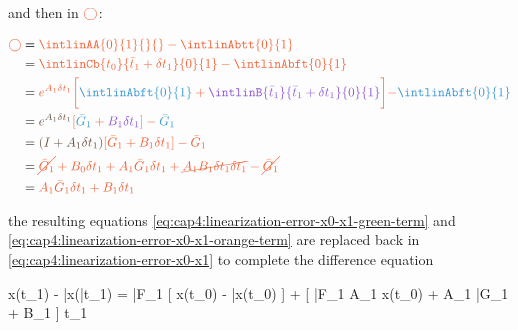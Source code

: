 \noindent
and then in $\orange{\bigcirc}$:

\noindent
\begin{align}
	\label{eq:cap4:linearization-error-x0-x1-orange-term}
	\orange{\bigcirc} 	&= \orange{ \intlinAA{0}{1}{}{} - \intlinAbtt{0}{1} } \nonumber \\ 
				   	&= \orange{ \intlinCb{t_0}{\bar{t}_1+\delta t_1}{0}{1} - \intlinAbft{0}{1} } \nonumber \\
				   	&= \orange{ e^{A_1 \delta t_1} \bigg[ \blue{\intlinAbft{0}{1}} + \purple{\intlinB{\bar{t}_1}{\bar{t}_1 + \delta t_1}{0}{1}} \bigg] }
				   	   \orange{ -\blue{\intlinAbft{0}{1}} } \nonumber \\
				   	&= \orange{ \pink{e^{A_1 \delta t_1}} [ \blue{\bar{G}_1} + \purple{B_1 \delta t_1} ] - \blue{\bar{G}_1} } \nonumber \\
				   	&= \orange{ \pink{(I + A_1 \delta t_1)}[ \bar{G}_1 + B_1 \delta t_1 ] - \bar{G}_1 } \nonumber \\
				   	&= \orange{ \cancel{\bar{G}_1} + B_0 \delta t_1 + A_1 \bar{G}_1 \delta t_1 + \cancel{A_1 B_1 \delta t_1 \delta t_1} - \cancel{\bar{G}_1} } \nonumber \\
				   	&= \orange{ A_1 \bar{G}_1 \delta t_1 + B_1 \delta t_1 }
\end{align}

\noindent
the resulting equations \eqref{eq:cap4:linearization-error-x0-x1-green-term} and \eqref{eq:cap4:linearization-error-x0-x1-orange-term} are replaced back in \eqref{eq:cap4:linearization-error-x0-x1} to complete the difference equation

\noindent
{}
{
	x(t_1) - \bar{x}(\bar{t}_1) = \bar{F}_1 [ x(t_0) - \bar{x}(t_0) ] + [ \bar{F}_1 A_1 x(t_0) + A_1 \bar{G}_1 + B_1 ] \delta t_1
}